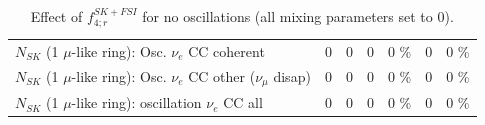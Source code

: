 \begin{table}
\begin{tabular}{| l | r | r | r  r | r  r |}
                          $N_{SK}$ (1 $\mu$-like ring): Osc. $\nu_e$ CC coherent &               0 &               0 &               0 &        0 \%  &               0 &        0 \%  \\ 
           $N_{SK}$ (1 $\mu$-like ring): Osc. $\nu_e$ CC other ($\nu_\mu$ disap) &               0 &               0 &               0 &        0 \%  &               0 &        0 \%  \\ 
                        $N_{SK}$ (1 $\mu$-like ring): oscillation $\nu_e$ CC all &               0 &               0 &               0 &        0 \%  &               0 &        0 \%  \\ 
\hline
\hline
\end{tabular}
\caption{ Effect of $f_{4; r}^{SK+FSI}$ for no oscillations (all mixing parameters set to 0). }
\label{tab:num_skdetfsi_004_1RmuT_3f_osc_t13:0_spectralreco_spectraltrue}
\end{table}
\clearpage
